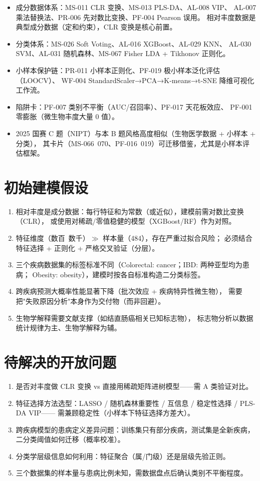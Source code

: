 \documentclass{internal-report}
\begin{document}
\begin{itemize}
  \item 成分数据体系：MS-011 CLR 变换、MS-013 PLS-DA、AL-008 VIP、
        AL-007 乘法替换法、PR-006 先对数比变换、PF-004 Pearson 误用。
        相对丰度数据是典型成分数据（定和约束），CLR 变换是核心前置。
  \item 分类体系：MS-026 Soft Voting、AL-016 XGBoost、AL-029 KNN、
        AL-030 SVM、AL-031 随机森林、MS-067 Fisher LDA + Tikhonov 正则化。
  \item 小样本保护链：PR-011 小样本正则化、PF-019 极小样本泛化评估（LOOCV）、
        WF-004 StandardScaler→PCA→K-means→t-SNE 降维可视化工作流。
  \item 陷阱卡：PF-007 类别不平衡（AUC/召回率）、PF-017 天花板效应、
        PF-001 零膨胀（微生物丰度大量 0 值）。
  \item 2025 国赛 C 题（NIPT）与本 B 题风格高度相似（生物医学数据 + 小样本 + 分类），
        其卡片（MS-066~070、PF-016~019）可迁移借鉴，尤其是小样本评估框架。
\end{itemize}

\section{初始建模假设}

\begin{enumerate}
  \item 相对丰度是成分数据：每行特征和为常数（或近似），建模前需对数比变换（CLR），
        或使用对稀疏/零值稳健的模型（XGBoost/RF）作为对照。
  \item 特征维度（数百~数千）$\gg$ 样本量（484），存在严重过拟合风险；
        必须结合特征选择 + 正则化 + 严格交叉验证（分层）。
  \item 三个疾病数据集的标签标准不同（Colorectal: cancer；IBD: 两种亚型均为患病；
        Obesity: obesity），建模时按各自标准构造二分类标签。
  \item 跨疾病预测大概率性能显著下降（批次效应 + 疾病特异性微生物），
        需要把"失败原因分析"本身作为交付物（而非回避）。
  \item 生物学解释需要文献支撑（如结直肠癌相关已知标志物），
        标志物分析以数据统计规律为主、生物学解释为辅。
\end{enumerate}

\section{待解决的开放问题}

\begin{enumerate}
  \item 是否对丰度做 CLR 变换 vs 直接用稀疏矩阵进树模型——需 A 类验证对比。
  \item 特征选择方法选型：LASSO / 随机森林重要性 / 互信息 / 稳定性选择 / PLS-DA VIP——
        需兼顾稳定性（小样本下特征选择方差大）。
  \item 跨疾病模型的患病定义差异问题：训练集只有部分疾病，测试集是全新疾病，
        二分类阈值如何迁移（概率校准）。
  \item 分类学层级信息如何利用：特征聚合（属/门级）还是层级先验正则。
  \item 三个数据集的样本量与患病比例未知，需数据盘点后确认类别不平衡程度。
\end{enumerate}
\end{document}
